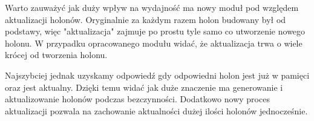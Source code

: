 Warto zauważyć jak duży wpływ na wydajność ma nowy moduł pod względem aktualizacji holonów. Oryginalnie za każdym razem holon budowany był od podstawy, więc "aktualizacja" zajmuje po prostu tyle samo co utworzenie nowego holonu. W przypadku opracowanego modułu widać, że aktualizacja trwa o wiele krócej od tworzenia holonu.

Najszybciej jednak uzyskamy odpowiedź gdy odpowiedni holon jest już w pamięci oraz jest aktualny. Dzięki temu widać jak duże znaczenie ma generowanie i aktualizowanie holonów podczas bezczynności. Dodatkowo nowy proces aktualizacji pozwala na zachowanie aktualności dużej ilości holonów jednocześnie.
